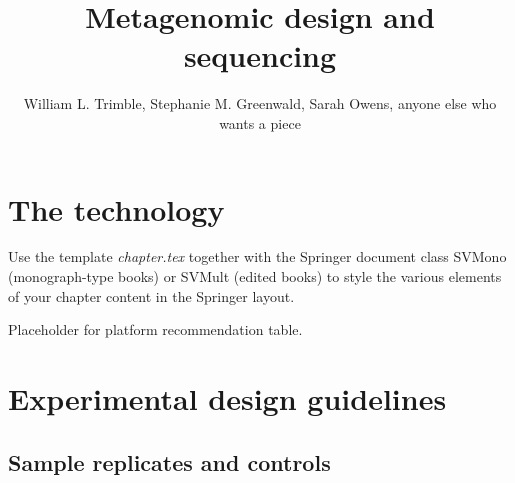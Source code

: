 \documentclass[graybox]{svmult}
\begin{document}
\title*{Metagenomic design and sequencing}
\author{William L. Trimble, Stephanie M. Greenwald, Sarah Owens, anyone else who wants a piece }
%
%
\maketitle



\section{The technology}
\label{sec:1}
Use the template \emph{chapter.tex} together with the Springer document class SVMono (monograph-type books) or SVMult (edited books) to style the various elements of your chapter content in the Springer layout.

Placeholder for platform recommendation table.

\section{Experimental design guidelines}
\label{sec:2}


\subsection{Sample replicates and controls}
\label{subsec:2}
\end{document}

